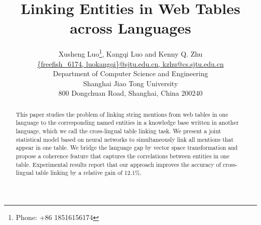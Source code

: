 \documentclass[letterpaper]{article} %
\begin{document}
%
\title{Linking Entities in Web Tables across Languages}
\author{
		Xusheng Luo\thanks{Phone: +86 18516156174},
		Kangqi Luo and
		Kenny Q. Zhu
		\\[0.5ex]
		\url{{freefish_6174, luokangqi}@sjtu.edu.cn, kzhu@cs.sjtu.edu.cn}\\[0.5ex]
		Department of Computer Science and Engineering\\[0.5ex]
		Shanghai Jiao Tong University\\[0.5ex]
		800 Dongchuan Road, Shanghai, China 200240
}
\maketitle
\begin{abstract}
This paper studies the problem of linking string mentions from web tables in one language
to the corresponding named entities in a knowledge base written in another language, 
which we call the cross-lingual table linking task. 
We present a joint statistical model based on neural networks to simultaneously link all mentions that appear in one table. 
We bridge the language gap by vector space transformation and propose a coherence feature that captures the correlations between entities in one table.
Experimental results report that our approach improves the accuracy of cross-lingual table linking
by a relative gain of 12.1\%.

\end{abstract}
\begin{CJK}{UTF8}{gbsn}
	 
%	
	
	
%	
%	 
	
	
	
\end{CJK}
\end{document}
